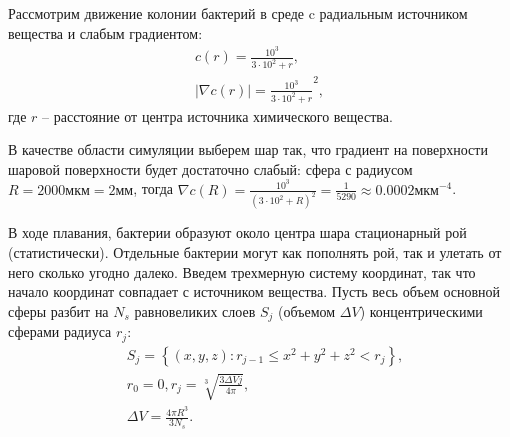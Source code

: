 Рассмотрим движение колонии бактерий в среде c радиальным источником вещества и слабым градиентом:
\begin{equation}
    \begin{aligned}
        c(r)=\frac{10^3}{3 \cdot 10^2+r},\\
        |\nabla c(r)|=\frac{10^3}{3 \cdot 10^2+r}^2,
    \label{eq:radial-chem}
    \end{aligned}
\end{equation}
где $r$ -- расстояние от центра источника химического вещества.

В качестве области симуляции выберем шар так, что градиент на поверхности шаровой поверхности будет достаточно слабый: сфера с радиусом $R=2000 \textrm{мкм}=2 \textrm{мм}$, тогда $\nabla c(R)=\frac{10^3}{(3 \cdot 10^2+R)^2} = \frac{1}{5290} \approx 0.0002 \textrm{мкм}^{-4}$.

В ходе плавания, бактерии образуют около центра шара стационарный рой (статистически). Отдельные бактерии могут как пополнять рой, так и улетать от него сколько угодно далеко. Введем трехмерную систему координат, так что начало координат совпадает с источником вещества. Пусть весь объем основной сферы разбит на $N_{s}$ равновеликих слоев $S_j$ (объемом $\Delta V$) концентрическими сферами радиуса $r_j$:
\begin{equation}
    \begin{aligned}
        &S_j=\left \{(x,y,z) : r_{j-1} \leq x^2+y^2+z^2<r_j \right \},\\
        &r_0=0, r_j=\sqrt[3]{\frac{3\Delta V j}{4\pi}},\\
        &\Delta V=\frac{4 \pi R^3}{3 N_s}.
    \label{eq:radial-spheres}
    \end{aligned}
\end{equation}


